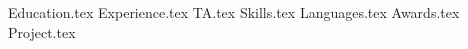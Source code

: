 \documentclass[11pt, a4paper]{awesome-cv}
\newcommand*{\sectiondir}{resume/}
\begin{document}
\makecvheader
\hspace{14.17 cm}


{Education.tex}
\vspace{0.7 cm}
{Experience.tex}
\vspace{0.7 cm}
{TA.tex}
\vspace{0.7 cm}
{Skills.tex}
\vspace{0.7 cm}
{Languages.tex}
\vspace{0.7 cm}
\newpage
{Awards.tex}
\vspace{0.5 cm}
{Project.tex}
\vspace{0.5 cm}
\end{document}
